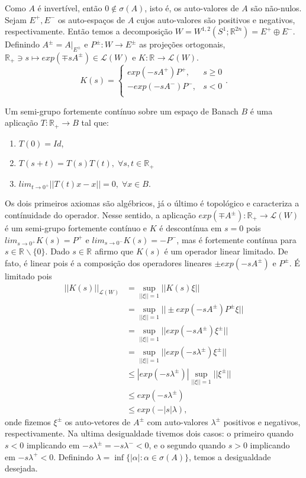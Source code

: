\documentclass[12pt]{book}
\newcommand{\circulo}{S^{1}}
\newcommand{\espacosobolevgeral}[2]{W^{1,#1}(#2)}
\newcommand{\funcaocond}[5]{
	#1 = 
	\left\{
	\begin{array}{cc}
		#2, & #3\\
		#4, & #5\\
	\end{array}
	\right.
}
\newcommand{\norma}[1]{||#1||}
\newcommand{\real}[1]{\mathbb{R}^{#1}}
\begin{document}
	Como $A$ é invertível, então $0 \notin \sigma(A)$, isto é, os auto-valores de $A$ são não-nulos. Sejam $E^{+}, E^{-}$ os auto-espaços de $A$ cujos auto-valores são positivos e negativos, respectivamente. Então temos a decomposição $W = \espacosobolevgeral{2}{\circulo;\real{2n}} = E^{+}\oplus E^{-}$. Definindo $A^{\pm}=A |_{E^{\pm}}$ e $P^{\pm}: W \to E^{\pm}$ as projeções ortogonais, $\real{}_{+} \ni s \mapsto exp(\mp s A^{\pm}) \in \mathcal{L}(W)$ e $K: \real{}\to \mathcal{L}(W)$.
	$$
	\funcaocond{K(s)}{exp(-s A^{+})P^{+}}{s \geq 0}{-exp(-s 	A^{-})P^{-}}{s<0}.
	$$
	
	Um semi-grupo fortemente contínuo sobre um espaço de Banach $B$ é uma aplicação $T:\real{}_{+}\to B$ tal que:
	
	\begin{enumerate}
		\item $T(0) = Id$,
		\item $T(s+t) = T(s)T(t), \;\forall s, t \in \real{}_{+}$
		\item $lim_{t \to 0^{+}}\norma{T(t)x - x } = 0, \; \forall x \in B $.
	\end{enumerate}
	Os dois primeiros  axiomas são algébricos, já o último é topológico e caracteriza a contínuidade do operador. Nesse sentido, a aplicação $exp(\mp A^{\pm}):\real{}_{+} \to \mathcal{L}(W)$ é um semi-grupo fortemente contínuo e $K$ é descontínua em $s=0$ pois $lim_{s\to 0^{+}}K(s) = P^{+}$ e $lim_{s\to 0^{-}} K(s)= -P^{-}$, mas é fortemente contínua para $s \in \real{}\backslash\{0\}$. Dado $s \in \real{}$ afirmo que $K(s)$ é um operador linear limitado. De fato, é linear pois é a composição dos operadores lineares $\pm exp(- sA^{\pm})$ e $P^{\pm}$. É limitado pois
	$$
	\begin{aligned}
		\norma{K(s)}_{\mathcal{L}(W)} &= \sup_{\norma{\xi}=1}\norma{K(s)\xi}
		\\
		&=\sup_{\norma{\xi}=1}\norma{\pm exp(- sA^{\pm})P^{\pm}\xi}
		\\
		&=\sup_{\norma{\xi}=1}\norma{exp(- sA^{\pm})\xi^{\pm}}
		\\
		&=\sup_{\norma{\xi}=1}\norma{exp(- s\lambda^{\pm})\xi^{\pm}}
		\\
		&\leq |exp(- s\lambda^{\pm})|\sup_{\norma{\xi}=1}\norma{\xi^{\pm}}
		\\
		&\leq exp(- s\lambda^{\pm})
		\\
		&\leq exp(- |s|\lambda),
	\end{aligned}
	$$
	onde fizemos $\xi^{\pm}$ os auto-vetores de $A^{\pm}$ com auto-valores $\lambda^{\pm}$ positivos e negativos, respectivamente. Na ultima desigualdade tivemos dois casos: o primeiro quando $s<0$ implicando em $- s\lambda^{\pm} = - s\lambda^{-} <0$, e o segundo quando $s>0$ implicando em $- s\lambda^{+}<0$. Definindo $\lambda = \inf \{|\alpha|: \alpha \in \sigma(A) \}$, temos a desigualdade desejada.
	
\end{document}
